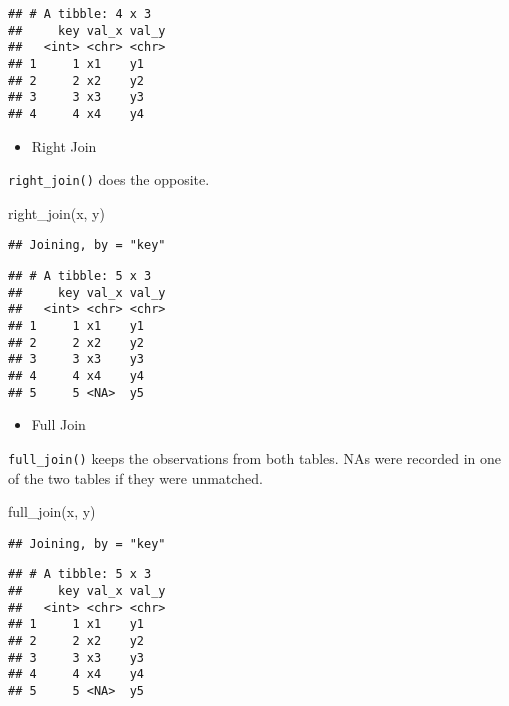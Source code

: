 \documentclass[
]{book}
\newenvironment{Shaded}{\begin{snugshade}}{\end{snugshade}}
\newcommand{\FunctionTok}[1]{\textcolor[rgb]{0.00,0.00,0.00}{#1}}
\newcommand{\NormalTok}[1]{#1}
\providecommand{\tightlist}{%
  \setlength{\itemsep}{0pt}\setlength{\parskip}{0pt}}
\begin{document}
\begin{verbatim}
## # A tibble: 4 x 3
##     key val_x val_y
##   <int> <chr> <chr>
## 1     1 x1    y1   
## 2     2 x2    y2   
## 3     3 x3    y3   
## 4     4 x4    y4
\end{verbatim}

\begin{itemize}
\tightlist
\item
  Right Join
\end{itemize}

\texttt{right\_join()} does the opposite.

\begin{Shaded}
\begin{Highlighting}[]
\FunctionTok{right\_join}\NormalTok{(x, y)}
\end{Highlighting}
\end{Shaded}

\begin{verbatim}
## Joining, by = "key"
\end{verbatim}

\begin{verbatim}
## # A tibble: 5 x 3
##     key val_x val_y
##   <int> <chr> <chr>
## 1     1 x1    y1   
## 2     2 x2    y2   
## 3     3 x3    y3   
## 4     4 x4    y4   
## 5     5 <NA>  y5
\end{verbatim}

\begin{itemize}
\tightlist
\item
  Full Join
\end{itemize}

\texttt{full\_join()} keeps the observations from both tables. NAs were recorded in one of the two tables if they were unmatched.

\begin{Shaded}
\begin{Highlighting}[]
\FunctionTok{full\_join}\NormalTok{(x, y)}
\end{Highlighting}
\end{Shaded}

\begin{verbatim}
## Joining, by = "key"
\end{verbatim}

\begin{verbatim}
## # A tibble: 5 x 3
##     key val_x val_y
##   <int> <chr> <chr>
## 1     1 x1    y1   
## 2     2 x2    y2   
## 3     3 x3    y3   
## 4     4 x4    y4   
## 5     5 <NA>  y5
\end{verbatim}
\end{document}
